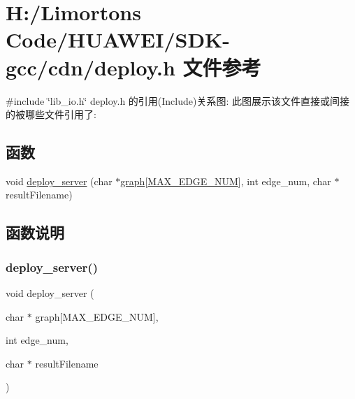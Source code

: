 \hypertarget{_s_d_k-gcc_2cdn_2deploy_8h}{}\section{H\+:/\+Limorton\textquotesingle{}s Code/\+H\+U\+A\+W\+E\+I/\+S\+D\+K-\/gcc/cdn/deploy.h 文件参考}
\label{_s_d_k-gcc_2cdn_2deploy_8h}
{\ttfamily \#include \char`\"{}lib\+\_\+io.\+h\char`\"{}}\newline
deploy.\+h 的引用(Include)关系图\+:
此图展示该文件直接或间接的被哪些文件引用了\+:
\subsection*{函数}
\begin{DoxyCompactItemize}
\item 
void \hyperlink{_s_d_k-gcc_2cdn_2deploy_8h_a758d7abeeb9609668c8e70e128076747}{deploy\+\_\+server} (char $\ast$\hyperlink{limorton___graph_8h_afba2e40a7cb5dccf3452a683c66d9f2c}{graph}\mbox{[}\hyperlink{_s_d_k-gcc_2cdn_2lib_2lib__io_8h_a5e17bfd66025e3f6293a10a5b507b3f6}{M\+A\+X\+\_\+\+E\+D\+G\+E\+\_\+\+N\+UM}\mbox{]}, int edge\+\_\+num, char $\ast$result\+Filename)
\end{DoxyCompactItemize}


\subsection{函数说明}
\mbox{\label{_s_d_k-gcc_2cdn_2deploy_8h_a758d7abeeb9609668c8e70e128076747}} 
\subsubsection{\texorpdfstring{deploy\+\_\+server()}{deploy\_server()}}
{\footnotesize\ttfamily void deploy\+\_\+server (\begin{DoxyParamCaption}\item[{char $\ast$}]{graph\mbox{[}\+M\+A\+X\+\_\+\+E\+D\+G\+E\+\_\+\+N\+U\+M\mbox{]},  }\item[{int}]{edge\+\_\+num,  }\item[{char $\ast$}]{result\+Filename }\end{DoxyParamCaption})}

